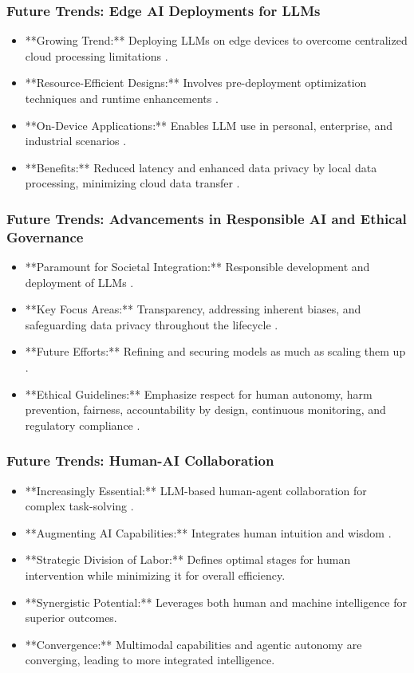 \documentclass{beamer}       %
\begin{document}
\begin{frame}
    \frametitle{Future Trends: Edge AI Deployments for LLMs}
    \begin{itemize}
        \item **Growing Trend:** Deploying LLMs on edge devices to overcome centralized cloud processing limitations .
        \item **Resource-Efficient Designs:** Involves pre-deployment optimization techniques and runtime enhancements .
        \item **On-Device Applications:** Enables LLM use in personal, enterprise, and industrial scenarios .
        \item **Benefits:** Reduced latency and enhanced data privacy by local data processing, minimizing cloud data transfer .
    \end{itemize}
\end{frame}

\begin{frame}
    \frametitle{Future Trends: Advancements in Responsible AI and Ethical Governance}
    \begin{itemize}
        \item **Paramount for Societal Integration:** Responsible development and deployment of LLMs .
        \item **Key Focus Areas:** Transparency, addressing inherent biases, and safeguarding data privacy throughout the lifecycle .
        \item **Future Efforts:** Refining and securing models as much as scaling them up .
        \item **Ethical Guidelines:** Emphasize respect for human autonomy, harm prevention, fairness, accountability by design, continuous monitoring, and regulatory compliance .
    \end{itemize}
\end{frame}

\begin{frame}
    \frametitle{Future Trends: Human-AI Collaboration}
    \begin{itemize}
        \item **Increasingly Essential:** LLM-based human-agent collaboration for complex task-solving .
        \item **Augmenting AI Capabilities:** Integrates human intuition and wisdom .
        \item **Strategic Division of Labor:** Defines optimal stages for human intervention while minimizing it for overall efficiency.
        \item **Synergistic Potential:** Leverages both human and machine intelligence for superior outcomes.
        \item **Convergence:** Multimodal capabilities and agentic autonomy are converging, leading to more integrated intelligence.
    \end{itemize}
\end{frame}
\end{document}
